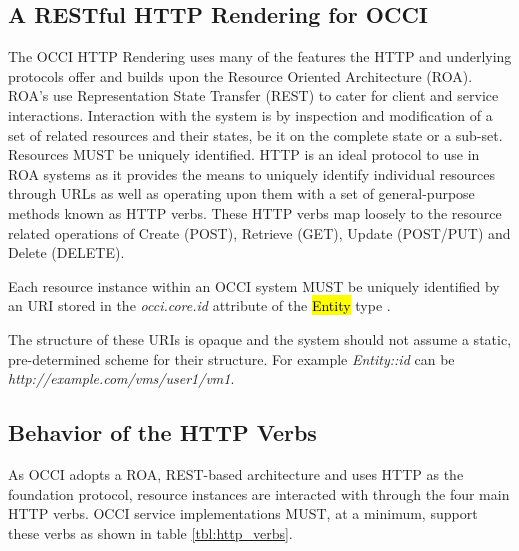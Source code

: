 \documentclass[10pt,a4paper]{article}
\begin{document}
\subsection{A RESTful HTTP Rendering for OCCI}
The OCCI HTTP Rendering uses many of the features the HTTP and underlying
protocols offer and builds upon the Resource Oriented
Architecture (ROA). ROA's use Representation State Transfer (REST)
\cite{REST_Fielding} to cater for client and service
interactions. Interaction with the system is by inspection and
modification of a set of related resources and their states, be it on
the complete state or a sub-set. Resources MUST be uniquely
identified. HTTP is an ideal protocol to use in ROA systems as it
provides the means to uniquely identify individual resources through
URLs as well as operating upon them with a set of general-purpose
methods known as HTTP verbs. These HTTP verbs map loosely to the
resource related operations of Create (POST), Retrieve (GET), Update
(POST/PUT) and Delete (DELETE).

Each resource instance within an OCCI system MUST be uniquely
identified by an URI stored in the \emph{occi.core.id} attribute of the
\hl{Entity} type \cite{occi:core}.

The structure of these URIs is opaque and the system should not assume
a static, pre-determined scheme for their structure. For example
\emph{Entity::id} can be \emph{http://example.com/vms/user1/vm1}.

\subsection{Behavior of the HTTP Verbs}
As OCCI adopts a ROA, REST-based architecture and uses HTTP as the
foundation protocol,  resource instances are interacted with 
through the four main HTTP verbs. OCCI service
implementations MUST, at a minimum, support these verbs as shown in
table \ref{tbl:http_verbs}.
\end{document}
